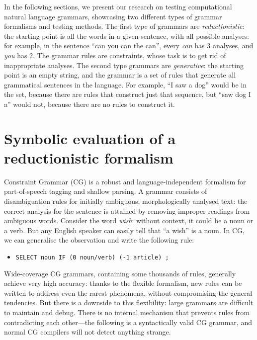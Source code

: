 In the following sections, we present our research on testing computational natural language grammars, showcasing two different types of grammar formalisms and testing methods. 
The first type of grammars are \emph{reductionistic}: the starting point is all the words in a given sentence, with all possible analyses: for example, in the sentence ``can you can the can'', every \emph{can} has 3 analyses, and \emph{you} has 2. The grammar rules are constraints, whose task is to get rid of inappropriate analyses.
The second type grammars are \emph{generative}: the starting point is an empty string, and the grammar is a set of rules that generate all grammatical sentences in the language. For example, ``I saw a dog'' would be in the set, because there are rules that construct just that sequence, but ``saw dog I a'' would not, because there are no rules to construct it.



\section{Symbolic evaluation of a reductionistic formalism}

Constraint Grammar (CG) \cite{karlsson1995constraint} is a robust and
language-independent formalism for part-of-speech tagging and shallow
parsing. A grammar consists of disambiguation rules for initially
ambiguous, morphologically analysed text: the correct analysis for the
sentence is attained by removing improper readings from ambiguous
words. Consider the word \emph{wish}: without context, it could be a
noun or a verb. But any English speaker can easily tell that ``a
wish'' is a noun. In CG, we can generalise the observation and write
the following rule:

\begin{itemize}
\item[] \texttt{SELECT noun IF (0 noun/verb) (-1 article) ;}
\end{itemize}

Wide-coverage CG grammars, containing some thousands of rules,
generally achieve very high accuracy:
thanks to the flexible formalism, new rules can be written
to address even the rarest phenomena, without compromising the general tendencies.
But there is a downside to this flexibility: large grammars are difficult to maintain
and debug. There is no internal mechanism that prevents rules from contradicting
each other---the following is a syntactically valid CG grammar, and normal CG compilers will not detect anything strange.

